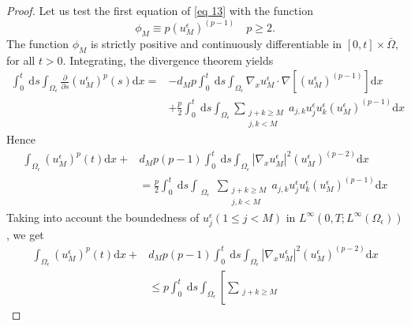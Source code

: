\begin{proof}
Let us test the first equation of \eqref{eq 13} with the function
$$
\phi_{M} \equiv p\left(u_{M}^{\epsilon}\right)^{(p-1)} \quad p \geq 2 .
$$
The function $\phi_{M}$ is strictly positive and continuously differentiable in $[0, t] \times \bar{\Omega}$, for all $t>0$. Integrating, the divergence theorem yields
\begin{equation}
  \begin{aligned}
\int_{0}^{t} \mathrm{~d} s \int_{\Omega_{\epsilon}} \frac{\partial}{\partial s}\left(u_{M}^{\epsilon}\right)^{p}(s) \mathrm{d} x=&-d_{M} p \int_{0}^{t} \mathrm{~d} s \int_{\Omega_{\epsilon}} \nabla_{x} u_{M}^{\epsilon} \cdot \nabla\left[\left(u_{M}^{\epsilon}\right)^{(p-1)}\right] \mathrm{d} x \\
&+\frac{p}{2} \int_{0}^{t} \mathrm{~d} s \int_{\Omega_{\epsilon}} \sum_{\substack{j+k \geq M \\
j,k<M}} a_{j, k} u_{j}^{\epsilon} u_{k}^{\epsilon}\left(u_{M}^{\epsilon}\right)^{(p-1)} \mathrm{d} x
\end{aligned}
\label{eq 69}\end{equation}
Hence
\begin{equation}
  \begin{aligned}
\int_{\Omega_{\epsilon}}\left(u_{M}^{\epsilon}\right)^{p}(t) \mathrm{d} x+& d_{M} p(p-1) \int_{0}^{t} \mathrm{~d} s \int_{\Omega_{\epsilon}}\left|\nabla_{x} u_{M}^{\epsilon}\right|^{2}\left(u_{M}^{\epsilon}\right)^{(p-2)} \mathrm{d} x \\
&=\frac{p}{2} \int_{0}^{t} \mathrm{~d} s \int_{\substack{\Omega_{\epsilon}}} \sum_{\substack{j+k \geq M \\
j,k<M}} a_{j, k} u_{j}^{\epsilon} u_{k}^{\epsilon}\left(u_{M}^{\epsilon}\right)^{(p-1)} \mathrm{d} x
\end{aligned}
\label{eq 70}\end{equation}
Taking into account the boundedness of $u_{j}^{\epsilon}(1 \leq j<M)$ in $L^{\infty}\left(0, T ; L^{\infty}\left(\Omega_{\epsilon}\right)\right)$, we get
\begin{equation}
  \begin{aligned}
\int_{\Omega_{\epsilon}}\left(u_{M}^{\epsilon}\right)^{p}(t) \mathrm{d} x+& d_{M} p(p-1) \int_{0}^{t} \mathrm{~d} s \int_{\Omega_{\epsilon}}\left|\nabla_{x} u_{M}^{\epsilon}\right|^{2}\left(u_{M}^{\epsilon}\right)^{(p-2)} \mathrm{d} x \\
& \leq p \int_{0}^{t} \mathrm{~d} s \int_{\Omega_{\epsilon}}\left[\sum_{\substack{j+k \geq M \\
}}
\end{aligned}
\end{equation}
\end{proof}
